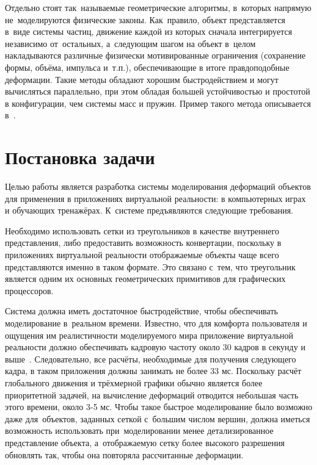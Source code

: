 \documentclass[a4paper, 14pt, titlepage]{extarticle}
\let\oldsection\section
\renewcommand{\section}{\newpage\oldsection}
\begin{document}
    Отдельно стоят так~называемые геометрические алгоритмы, в~которых напрямую не~моделируются
    физические законы. Как~правило, объект представляется в~виде системы частиц, движение каждой из
    которых сначала интегрируется независимо от~остальных, а~следующим шагом на объект в~целом
    накладываются различные физически мотивированные ограничения (сохранение формы, объёма, импульса
    и~т.п.), обеспечивающие в итоге правдоподобные деформации. Такие методы обладают хорошим
    быстродействием и могут вычисляться параллельно, при этом обладая большей устойчивостью и
    простотой в конфигурации, чем системы масс и пружин. Пример такого метода описывается в~\cite{mueller-meshless}.

  \section{Постановка задачи}\label{sec:task}

    Целью работы является разработка системы моделирования деформаций объектов для применения в
    приложениях виртуальной реальности: в компьютерных играх и обучающих тренажёрах.
    К~системе предъявляются следующие требования.

    Необходимо использовать сетки из треугольников в качестве внутреннего представления, либо
    предоставить возможность конвертации, поскольку в приложениях виртуальной реальности отображаемые объекты
    чаще всего представляются именно в таком формате. Это связано с~тем, что треугольник является
    одним их основных геометрических примитивов для графических процессоров.~\cite{nvidia-tutorial}

    Система должна иметь достаточное быстродействие, чтобы обеспечивать моделирование в~реальном
    времени. Известно, что для комфорта пользователя и ощущения им реалистичности моделируемого мира
    приложение виртуальной реальности должно обеспечивать кадровую частоту около 30 кадров в секунду %
    и выше~\cite{claypool-framerate}. Следовательно, все расчёты, необходимые для получения
    следующего кадра, в таком приложения должны занимать не более 33 мс. Поскольку расчёт глобального
    движения и трёхмерной графики обычно является более приоритетной задачей, на вычисление
    деформаций отводится небольшая часть этого времени, около 3-5 мс. Чтобы такое быстрое
    моделирование было возможно даже для~объектов, заданных сеткой с~большим числом вершин,
    должна иметься возможность использовать при~моделировании менее детализированное представление
    объекта, а~отображаемую сетку более высокого разрешения обновлять так, чтобы она повторяла
    рассчитанные деформации. %
\end{document}
